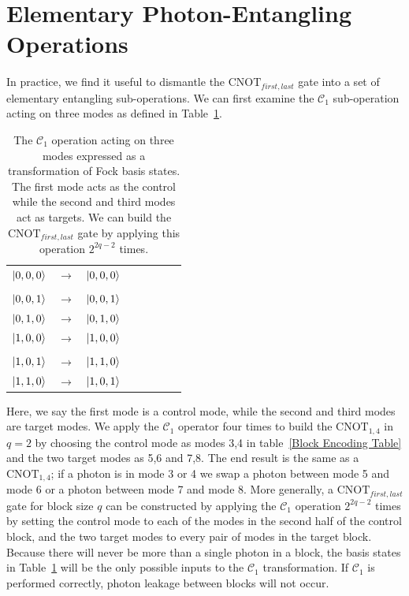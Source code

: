 \documentclass[aps,pra,twocolumn,showpacs,superscriptaddress,floatfix,10pt]{revtex4}
\begin{document}
\section{Elementary Photon-Entangling Operations}
\label{Section Elementary Photon Entangling Operations}

 In practice, we find it useful to dismantle the $\mbox{CNOT}_{first,last}$ gate into a set of elementary entangling sub-operations. We can first examine the $\mathcal{C}_1$ sub-operation acting on three modes as defined in Table~\ref{One Control Two Targets}. 
\begin {table}[h]
\begin{center}
	\begin{tabular}{l*{6}{c}r} 
		$\ket{0,0,0}$  &  $\rightarrow$ & $\ket{0,0,0}$ \\ \\
		$\ket{0,0,1}$  & $\rightarrow$ & $\ket{0,0,1}$ \\
		$\ket{0,1,0}$ & $\rightarrow$ & $\ket{0,1,0}$ \\
		$\ket{1,0,0}$ & $\rightarrow$ & $\ket{1,0,0} $ \\ \\
		$\ket{1,0,1}$ & $\rightarrow$ & $\ket{1,1,0}$ \\
		$\ket{1,1,0}$ & $\rightarrow$ & $\ket{1,0,1}$ \\
	\end{tabular}
	\caption{ \label{One Control Two Targets} The $\mathcal{C}_1$  operation acting on three modes expressed as a transformation of Fock basis states. The first mode acts as the control while the second and third modes act as targets. We can build the $\mbox{CNOT}_{first,last}$ gate by applying this operation $2^{2 q -2}$ times.}
\end{center}
\end{table}
Here, we say the first mode is a control mode, while the second and third modes are target modes. We apply the $\mathcal{C}_1$  operator four times to build the $\mbox{CNOT}_{1,4}$ in $q=2$ by choosing the control mode as modes 3,4 in table~\ref{Block Encoding Table} and the two target modes as 5,6 and 7,8. The end result is the same as a $\mbox{CNOT}_{1,4}$; if a photon is in mode 3 or 4 we swap a photon between mode 5 and mode 6 or a photon between mode 7 and mode 8. More generally, a $\mbox{CNOT}_{first,last}$ gate for block size $q$ can be constructed by applying the $\mathcal{C}_1$  operation $2^{2q-2}$ times by setting the control mode to each of the modes in the second half of the control block, and the two target modes to every pair of modes in the target block. Because there will never be more than a single photon in a block, the basis states in Table~\ref{One Control Two Targets} will be the only possible inputs to the $\mathcal{C}_1$  transformation. If $\mathcal{C}_1$ is performed correctly, photon leakage between blocks will not occur.
\end{document}
